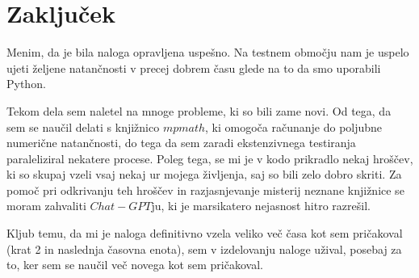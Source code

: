 \documentclass[slovene,11pt,a4paper]{article}
\begin{document}
\section{Zaključek}
Menim, da je bila naloga opravljena uspešno. Na testnem območju nam je uspelo ujeti željene natančnosti v precej dobrem času glede na to da smo uporabili Python. 

Tekom dela sem naletel na mnoge probleme, ki so bili zame novi. Od tega, da sem se naučil delati s knjižnico $mpmath$, ki omogoča računanje do poljubne numerične natančnosti, do tega da sem zaradi ekstenzivnega testiranja paraleliziral nekatere procese. Poleg tega, se mi je v kodo prikradlo nekaj hroščev, ki so skupaj vzeli vsaj nekaj ur mojega življenja, saj so bili zelo dobro skriti. Za pomoč pri odkrivanju teh hroščev in razjasnjevanje misterij neznane knjižnice se moram zahvaliti $Chat-GPT$ju, ki je marsikatero nejasnost hitro razrešil.

Kljub temu, da mi je naloga definitivno vzela veliko več časa kot sem pričakoval (krat 2 in naslednja časovna enota), sem v izdelovanju naloge užival, posebaj za to, ker sem se naučil več novega kot sem pričakoval.


\newpage


\end{document}
